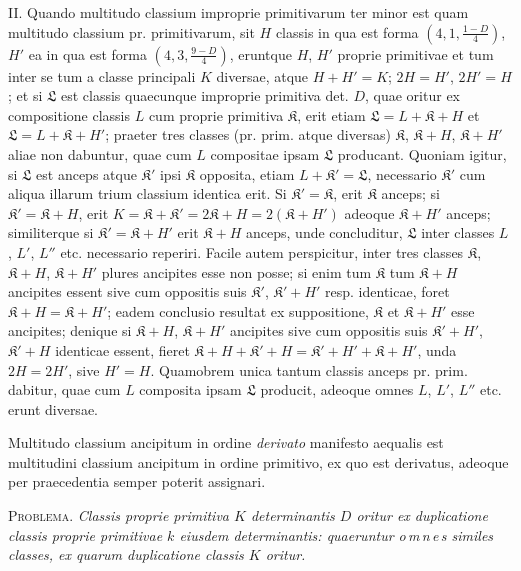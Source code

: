 II. Quando multitudo classium improprie primitivarum ter minor est quam
multitudo classium pr. primitivarum, sit $H$ classis in qua est forma $\left(4,\allowbreak 1,\allowbreak \frac{1-D}{4}\right)$,
$H'$ ea in qua est forma $\left(4,\allowbreak 3,\allowbreak \frac{9-D}{4}\right)$, eruntque $H$, $H'$ proprie primitivae et tum
inter se tum a classe principali $K$ diversae, atque $H+H'=K$; $2H=H'$,
$2H'=H$; et si $\mathfrak{L}$ est classis quaecunque improprie primitiva det. $D$, quae oritur
ex compositione classis $L$ cum proprie primitiva $\mathfrak{K}$, erit etiam $\mathfrak{L}=L+\mathfrak{K}+H$
et $\mathfrak{L}=L+\mathfrak{K}+H'$; praeter tres classes (pr. prim. atque diversas) $\mathfrak{K}$, $\mathfrak{K}+H$,
$\mathfrak{K}+H'$ aliae non dabuntur, quae cum $L$ compositae ipsam $\mathfrak{L}$ producant. Quoniam
igitur, si $\mathfrak{L}$ est anceps atque $\mathfrak{K}'$ ipsi $\mathfrak{K}$ opposita, etiam $L+\mathfrak{K}'=\mathfrak{L}$, necessario
$\mathfrak{K}'$ cum aliqua illarum trium classium identica erit. Si $\mathfrak{K}'=\mathfrak{K}$, erit $\mathfrak{K}$ anceps;
si $\mathfrak{K}'=\mathfrak{K}+H$, erit $K=\mathfrak{K}+\mathfrak{K}'=2\mathfrak{K}+H=2(\mathfrak{K}+H')$ adeoque $\mathfrak{K}+H'$
anceps; similiterque si $\mathfrak{K}'=\mathfrak{K}+H'$ erit $\mathfrak{K}+H$ anceps, unde concluditur,
$\mathfrak{L}$ inter classes $L$, $L'$, $L''$ etc. necessario reperiri. Facile autem perspicitur, inter
tres classes $\mathfrak{K}$, $\mathfrak{K}+H$, $\mathfrak{K}+H'$ plures ancipites esse non posse; si enim tum $\mathfrak{K}$
tum $\mathfrak{K}+H$ ancipites essent sive cum oppositis suis $\mathfrak{K}'$, $\mathfrak{K}'+H'$ resp. identicae,
foret $\mathfrak{K}+H=\mathfrak{K}+H'$; eadem conclusio resultat ex suppositione, $\mathfrak{K}$ et $\mathfrak{K}+H'$
esse ancipites; denique si $\mathfrak{K}+H$, $\mathfrak{K}+H'$ ancipites sive cum oppositis suis
$\mathfrak{K}'+H'$, $\mathfrak{K}'+H$ identicae essent, fieret $\mathfrak{K}+H+\mathfrak{K}'+H=\mathfrak{K}'+H'+\mathfrak{K}+H'$,
unda $2H=2H'$, sive $H'=H$. Quamobrem unica tantum classis anceps pr.
prim. dabitur, quae cum $L$ composita ipsam $\mathfrak{L}$ producit, adeoque omnes $L$, $L'$, $L''$
etc. erunt diversae.

Multitudo classium ancipitum in ordine \textit{derivato} manifesto aequalis est multitudini
classium ancipitum in ordine primitivo, ex quo est derivatus, adeoque per
praecedentia semper poterit assignari.

\textsc{Problema.} \textit{Classis proprie primitiva $K$ determinantis $D$ oritur ex duplicatione
classis proprie primitivae $k$ eiusdem determinantis: quaeruntur o\,m\,n\,e\,s similes
classes, ex quarum duplicatione classis $K$ oritur.}

